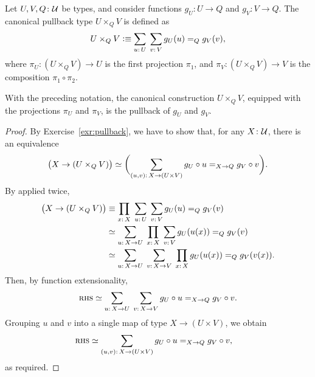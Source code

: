 \begin{ntn}
    Let\/ $U,V,Q\colon\univ$ be types, and consider functions\/ $g_U\colon U\to Q$ and\/ $g_V\colon V\to Q$. The canonical pullback type\/ $U\times_Q V$ is defined as
    \[
        U\times_Q V
            \defeq
                \sum_{u\colon U}\;
                \sum_{v\colon V}g_U(u)\eq{Q}g_V(v),
    \]
    where\/ $\pi_U\colon(U\times_Q V)\to U$ is the first projection\/ $\pi_1$, and\/ $\pi_V\colon(U\times_Q V)\to V$ is the composition\/ $\pi_1\circ\pi_2$.
\end{ntn}

\begin{lem}\fe\label{lem:pullback}
    With the preceding notation, the canonical construction\/ $U\times_Q V$, equipped with the projections\/ $\pi_U$ and\/ $\pi_V$, is the pullback of\/ $g_U$ and\/ $g_V$.
\end{lem}

\begin{proof}
    By Exercise~\ref{exr:pullback}, we have to show that, for any $X\colon\univ$, there is an equivalence
    \[
        \bigl(X\to(U\times_Q V)\bigr)
        \simeq
            \biggl(
                \sum_{(u,v)\colon X\to(U\times V)}
                g_U\circ u\eq{X\to Q}g_V\circ v
            \biggr).
    \]
    By  applied twice,
    \begin{align*}
        \bigl(X\to(U\times_Q V)\bigr)
            &\equiv\prod_{x\colon X}\;
                \sum_{u\colon U}\;
                \sum_{v\colon V}g_U(u)\eq{Q}g_V(v)\\
            &\simeq\sum_{u\colon X\to U}\;
                \prod_{x\colon X}\;
                \sum_{v\colon V}g_U(u(x))\eq{Q}g_V(v)\\
            &\simeq\sum_{u\colon X\to U}\;
                \sum_{v\colon X\to V}\;
                \prod_{x\colon X}g_U(u(x))\eq{Q}g_V(v(x)).
    \end{align*}
    Then, by function extensionality,
    \[
        \rhs
            \simeq\sum_{u\colon X\to U}\;
                \sum_{v\colon X\to V}
                    g_U\circ u\eq{X\to Q}g_V\circ v.
    \]
    Grouping $u$ and $v$ into a single map of type $X\to(U\times V)$, we obtain
    \begin{align*}
        \rhs
            &\simeq\sum_{(u,v)\colon X\to(U\times V)}
                g_U\circ u\eq{X\to Q}g_V\circ v,
    \end{align*}
    as required.
\end{proof}

